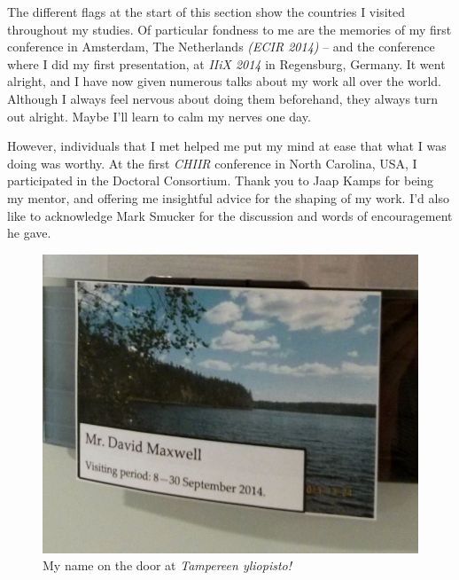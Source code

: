 \begin{preamble}
The different flags at the start of this section show the countries I visited throughout my studies. Of particular fondness to me are the memories of my first conference in Amsterdam, The Netherlands \emph{(ECIR 2014)} -- and the conference where I did my first presentation, at \emph{IIiX 2014} in Regensburg, Germany. It went alright, and I have now given numerous talks about my work all over the world. Although I always feel nervous about doing them beforehand, they always turn out alright. Maybe I'll learn to calm my nerves one day.

However, individuals that I met helped me put my mind at ease that what I was doing was worthy. At the first \emph{CHIIR} conference in North Carolina, USA, I participated in the Doctoral Consortium. Thank you to Jaap Kamps for being my mentor, and offering me insightful advice for the shaping of my work. I'd also like to acknowledge Mark Smucker for the discussion and words of encouragement he gave.

\renewcommand{\figurename}{Picture}
\begin{figure}
    \begin{center}
    \vspace*{-9mm}
    \includegraphics[width=1\textwidth]{figures/ch0-tampere.jpg}
    \end{center}
    \vspace*{-6mm}
    \caption{My name on the door at \emph{Tampereen yliopisto!}}
    \label{fig:acks_finland}
\end{figure}
\renewcommand{\figurename}{Figure}


\end{preamble}
